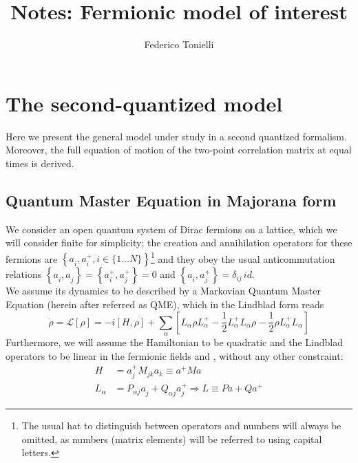 \documentclass[a4paper,11pt]{article}
\title{Notes: Fermionic model of interest}
\author{Federico Tonielli}
\newcommand\blankpage{%
    \null
    \thispagestyle{empty}%
    \addtocounter{page}{-1}%
    \newpage}
\newcommand{\ro}{\rho}
\newcommand{\np}{\vskip 1.3cm}
\begin{document}
 \maketitle
 
 \tableofcontents
 \blankpage
 
 \section{The second-quantized model}
 Here we present the general model under study in a second quantized formalism.  Moreover, the full equation of motion of the two-point correlation matrix at equal times is derived.
  \np
  \subsection{Quantum Master Equation in Majorana form}
   We consider an open quantum system of Dirac fermions on a lattice, which we will consider finite for simplicity; the creation and annihilation operators for these fermions are $\left \{ a_i^{ },a_i^+, i\in \{1\dots N\} \right \} $\footnote{ The usual hat to distinguish between operators and numbers will always be omitted, as numbers (matrix elements) will be referred to using capital letters.} and they obey the usual anticommutation relations $\left\{a_i^{ },a_j^{ }\right\} = \left\{a_i^{+},a_j^+\right \}=0$ and $\left\{a_i^{ },a_j^+\right \} = \delta_{ij}\,id $.\\  We assume its dynamics to be described by a Markovian Quantum Master Equation (herein after referred as QME), which in the Lindblad form reads
   \[\dot{\ro}=\mathcal{L}[\ro]=-i\left[H,\ro\right]+\sum_{\alpha}\left[L_{\alpha}^{ }\ro L_{\alpha}^+ - \frac{1}{2}L_{\alpha}^+L_{\alpha}^{ }\ro - \frac{1}{2}\ro L_{\alpha}^+L_{\alpha}^{ }\right]  \]
   Furthermore, we will assume the Hamiltonian to be quadratic and the Lindblad operators to be linear in the fermionic fields  and , without any other constraint: 
   \begin{subequations}        %
   \label{eq:quadr_dyn}         %
   \begin{align}
    H & = a_j^+M_{jk}a_k^{ } \equiv a^+Ma \label{eq:quadr_ham}\\         %
    L_{\alpha} & = P^{ }_{\alpha j}a_j^{ } + Q^{ }_{\alpha j}a_j^+ \Rightarrow L \equiv P a + Q a^+ \label{eq:quadr_lindb}
   \end{align}
   \end{subequations}
\end{document}
